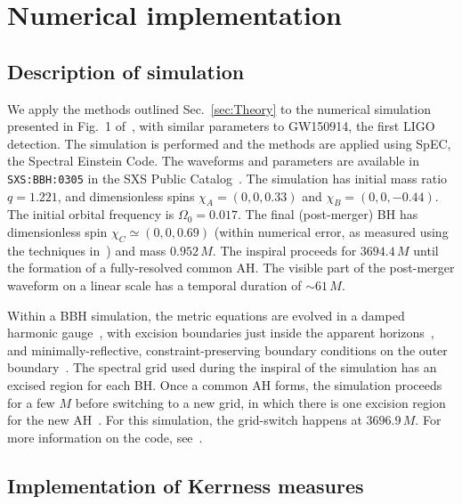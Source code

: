 
\section{Numerical implementation}
\label{sec:Implementation}

\subsection{Description of simulation}
\label{sec:simulation}

We apply the methods outlined Sec.~\ref{sec:Theory} to the numerical simulation presented in Fig.~1 of~\cite{PhysRevLett.116.061102}, with similar parameters to GW150914, the first LIGO detection. The simulation is performed and the methods are applied using SpEC, the Spectral Einstein Code. The waveforms and parameters are available in \texttt{SXS:BBH:0305} in the SXS Public Catalog~\cite{SXS:catalog}. The simulation has initial mass ratio $q = 1.221$, and dimensionless spins $\chi_A = (0, 0, 0.33)$ and $\chi_B = (0, 0, -0.44)$. The initial orbital frequency is $\Omega_0 = 0.017$. The final (post-merger) BH has dimensionless spin $\chi_C \simeq (0, 0, 0.69)$ (within numerical error, as measured using the techniques in~\cite{Scheel:2008rj}) and mass $0.952\,M$. The inspiral proceeds for $3694.4\,M$ until the formation of a fully-resolved common AH. The visible part of the post-merger waveform on a linear scale has a temporal duration of $\sim 61\,M$. 

Within a BBH simulation, the metric equations are evolved in a damped harmonic gauge~\cite{Szilagyi:2009qz, Lindblom2009c}, with excision boundaries just inside the apparent horizons~\cite{Hemberger:2012jz, Scheel2014}, and minimally-reflective, constraint-preserving boundary conditions on the outer boundary~\cite{Rinne2007}. The spectral grid used during the inspiral of the simulation has an excised region for each BH. Once a common AH forms, the simulation proceeds for a few $M$ before switching to a new grid, in which there is one excision region for the new AH~\cite{Hemberger:2012jz}. For this simulation, the grid-switch happens at $3696.9\,M$. For more information on the code, see~\cite{Lovelace:2016uwp}.

\subsection{Implementation of Kerrness measures}
\label{sec:numericalimplementation}

